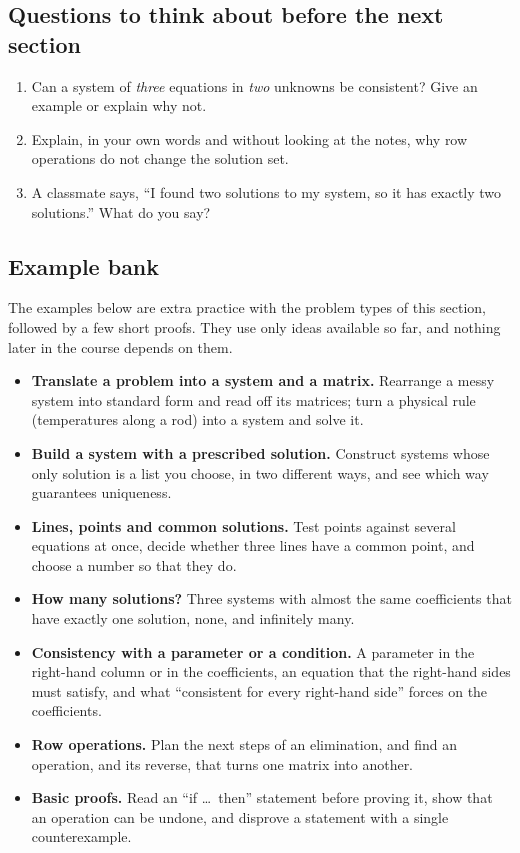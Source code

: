 \documentclass[11pt]{article}
\begin{document}
\subsection*{Questions to think about before the next section}
\begin{enumerate}
  \item Can a system of \emph{three} equations in \emph{two} unknowns be consistent? Give an example
        or explain why not.
  \item Explain, in your own words and without looking at the notes, why row operations do not
        change the solution set.
  \item A classmate says, ``I found two solutions to my system, so it has exactly two solutions.''
        What do you say?
\end{enumerate}
 
\subsection*{Example bank}

The examples below are extra practice with the problem types of this section, followed by a few short proofs. They use only ideas available so far, and nothing later in the course depends on them.

\begin{remark}
\begin{itemize}
  \item \textbf{Translate a problem into a system and a matrix.} Rearrange a messy system into standard form and read off its matrices; turn a physical rule (temperatures along a rod) into a system and solve it.
  \item \textbf{Build a system with a prescribed solution.} Construct systems whose only solution is a list you choose, in two different ways, and see which way guarantees uniqueness.
  \item \textbf{Lines, points and common solutions.} Test points against several equations at once, decide whether three lines have a common point, and choose a number so that they do.
  \item \textbf{How many solutions?} Three systems with almost the same coefficients that have exactly one solution, none, and infinitely many.
  \item \textbf{Consistency with a parameter or a condition.} A parameter in the right-hand column or in the coefficients, an equation that the right-hand sides must satisfy, and what ``consistent for every right-hand side'' forces on the coefficients.
  \item \textbf{Row operations.} Plan the next steps of an elimination, and find an operation, and its reverse, that turns one matrix into another.
  \item \textbf{Basic proofs.} Read an ``if \dots\ then'' statement before proving it, show that an operation can be undone, and disprove a statement with a single counterexample.
\end{itemize}
\end{remark}
\end{document}
